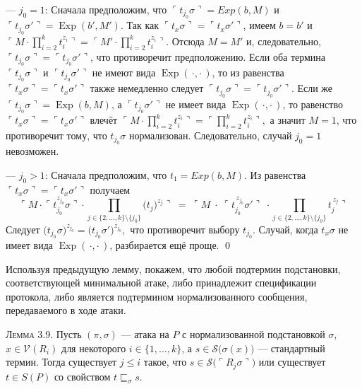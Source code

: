 — $j_0 = 1$: Сначала предположим, что
\(
  \ulcorner t_{j_0}\sigma \urcorner = Exp(b,M)
\)
и
\(
  \ulcorner t_{j_0}\sigma' \urcorner = \operatorname{Exp}(b',M').
\)
Так как \(\ulcorner t_x\sigma \urcorner = \ulcorner t_x\sigma' \urcorner\), имеем
\(b=b'\) и
\(
  \ulcorner M\!\cdot\!\prod_{i=2}^{k} t_i^{z_i} \urcorner
  =
  \ulcorner M'\!\cdot\!\prod_{i=2}^{k} t_i^{z_i} \urcorner.
\)
Отсюда \(M=M'\) и, следовательно,
\(\ulcorner t_{j_0}\sigma \urcorner = \ulcorner t_{j_0}\sigma'\urcorner\),
что противоречит предположению. Если оба термина \(\ulcorner t_{j_0}\sigma \urcorner\) и \(\ulcorner t_{j_0}\sigma' \urcorner\)
не имеют вида \(\operatorname{Exp}(\,\cdot,\cdot\,)\),
то из равенства \(\ulcorner t_x\sigma \urcorner = \ulcorner t_x\sigma' \urcorner\)
также немедленно следует
\(\ulcorner t_{j_0}\sigma \urcorner = \ulcorner t_{j_0}\sigma' \urcorner \).
Если же
\(\ulcorner t_{j_0}\sigma \urcorner = \operatorname{Exp}(b,M)\),
а \(\ulcorner t_{j_0}\sigma' \urcorner\) не имеет вида
\(\operatorname{Exp}(\,\cdot,\cdot\,)\),
то равенство \(\ulcorner t_x\sigma \urcorner = \ulcorner t_x\sigma' \urcorner \)
влечёт
\(
  \ulcorner M\!\cdot\!\prod_{i=2}^{k} t_i^{z_i} \urcorner
  =
  \ulcorner \prod_{i=2}^{k} t_i^{z_i}\urcorner,
\)
а значит \(M=1\), что противоречит тому, что
\(t_{j_0}\sigma\) нормализован.
Следовательно, случай \(j_0 = 1\) невозможен.

— $j_0>1$:  
Сначала предположим, что \(t_1 = Exp(b,M)\).
Из равенства \(\ulcorner t_x\sigma\urcorner = \ulcorner t_x\sigma'\urcorner\) получаем
\[
  \ulcorner M \!\cdot\!
  \ulcorner t_{j_0}^{z_{j_0}}\sigma \urcorner\!
  \cdot
  \prod_{j\in\{2,\dots,k\}\setminus\{j_0\}}
     \bigl(t_j\bigr)^{z_j}\urcorner
  \;=\;
  \ulcorner M\;\cdot\;
  \ulcorner t_{j_0}^{\,z_{j_0}}\sigma'\urcorner\;
  \cdot\!
  \prod_{j\in\{2,\dots,k\}\setminus\{j_0\}} t_j^{\,z_j}\urcorner
\]
Следует
\(
  \bigl(t_{j_0}\sigma\bigr)^{z_{j_0}}
  =
  \bigl(t_{j_0}\sigma'\bigr)^{z_{j_0}},
\)
что противоречит выбору \(t_{j_0}\).
Случай, когда \(t_x\sigma\) не имеет вида
\(\operatorname{Exp}(\,\cdot,\cdot\,)\),
разбирается ещё проще. \qed

Используя предыдущую лемму, покажем, что любой подтермин подстановки,
соответствующей минимальной атаке,
либо принадлежит спецификации протокола,
либо является подтермином нормализованного сообщения,
передаваемого в ходе атаки.

\textsc{Лемма 3.9.}
Пусть \((\pi,\sigma)\) — атака на \(P\) с нормализованной подстановкой
\(\sigma\),
\(x\in\mathcal V(R_i)\) для некоторого
\(i\in\{1,\dots,k\}\),
а \(s\in \mathcal S\!\bigl(\sigma(x)\bigr)\) — стандартный термин.
Тогда существует \(j\le i\) такое, что
\(
  s\in \mathcal S\!\bigl(\ulcorner R_j\sigma\urcorner\bigr)
\)
или существует \(t\in S(P)\) со свойством \(t\sqsubseteq_{\sigma}s\).

